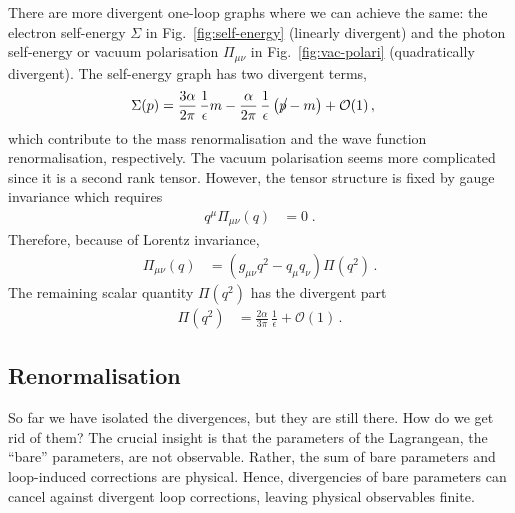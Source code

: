 \documentclass[12pt]{report}
\renewcommand{\slash}[2][4]{\ensuremath{\rlap{\raisebox{1pt}{$\mspace{#1mu}/$}}#2}}
\newcommand{\2}{\ensuremath{\sqrt{2}\,}}
\begin{document}
{      There are more divergent one-loop graphs where we can achieve the same: the electron
      self-energy $\Sigma$ in Fig.~\ref{fig:self-energy} (linearly
      divergent) and the photon self-energy or vacuum polarisation $\Pi_{\mu\nu}$ in Fig.~\ref{fig:vac-polari} (quadratically divergent). The
      self-energy graph has two divergent terms,  
      \begin{align}
        \Sigma(p)&= \frac{3\alpha}{2\pi}\, \frac{1}{\epsilon} m - \frac{\alpha}{2\pi}\,
        \frac{1}{\epsilon}\left(\slash[2]{p} -m\right) +\mathcal{O}(1)\,,
      \end{align}
      which contribute to the mass renormalisation and the wave function renormalisation,
      respectively. The vacuum polarisation seems more complicated since it is a second rank
      tensor. However, the tensor structure is fixed by gauge invariance which requires
      \begin{align}
        q^\mu \Pi_{\mu\nu}\left(q\right) &= 0\;.
      \end{align}
      Therefore, because of Lorentz invariance,
      \begin{align}
        \Pi_{\mu\nu}\left(q\right) &= \left(g_{\mu\nu} q^2 - q_\mu q_\nu\right) \Pi\! \left(q^2\right)
        \,.
      \end{align}
      The remaining scalar quantity $\Pi(q^2)$ has the divergent part
      \begin{align}
        \Pi\!\left(q^2\right) &= \frac{2\alpha}{3\pi} \, \frac{1}{\epsilon}  +\mathcal{O}(1)\,.
      \end{align}

      


      \subsection{Renormalisation}
      So far we have isolated the divergences, but they are still there. How do we get rid of
      them? The crucial insight is that the parameters of the Lagrangean, the ``bare'' parameters,
      are not observable. Rather, the sum of bare parameters and loop-induced corrections are
      physical. Hence, divergencies of bare parameters  can cancel against divergent loop
      corrections, leaving physical observables finite. 

}
\end{document}
